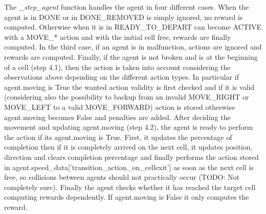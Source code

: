 \documentclass[12pt, a4paper, hidelinks]{article}
\begin{document}
The \textit{\_step\_agent} function handles the agent in four different cases.
When the agent is in DONE or in DONE\_REMOVED is simply ignored, no reward is computed.
Otherwise when it is in READY\_TO\_DEPART can become ACTIVE with a MOVE\_* action and with the initial cell free, rewards are finally computed.
In the third case, if an agent is in malfunction, actions are ignored and rewards are computed.
Finally, if the agent is not broken and is at the beginning of a cell (step 4.1), then the action is taken into account considering the observations above depending on the different action types.
In particular if agent.moving is True the wanted action validity is first checked and if it is valid (considering also the possibility to backup from an invalid MOVE\_RIGHT or MOVE\_LEFT to a valid MOVE\_FORWARD) action is stored otherwise agent.moving becomes False and penalties are added.
After deciding the movement and updating agent.moving (step 4.2), the agent is ready to perform the action if its agent.moving is True.
First, it updates the percentage of completion then if it is completely arrived on the next cell, it updates position, direction and clears completion percentage and finally performs the action stored in agent.speed\_data['transition\_action\_on\_cellexit'] as soon as the next cell is free, so collisions between agents should not practically occur (TODO: Not completely sure).
Finally the agent checks whether it has reached the target cell computing rewards dependently.
If agent.moving is False it only computes the reward.\\
\end{document}
